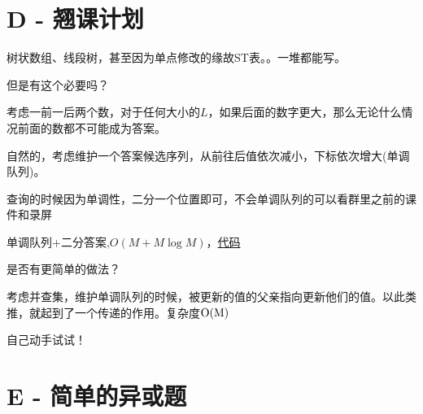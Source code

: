 \documentclass{beamer}
\begin{document}
  \section{D - 翘课计划}
  \begin{frame}
    树状数组、线段树，甚至因为单点修改的缘故ST表。。一堆都能写。

    \vspace*{1\baselineskip}

    但是有这个必要吗？

    \vspace*{1\baselineskip}
    
    考虑一前一后两个数，对于任何大小的$L$，如果后面的数字更大，那么无论什么情况前面的数都不可能成为答案。
    
    \vspace*{1\baselineskip}
    
    自然的，考虑维护一个答案候选序列，从前往后值依次减小，下标依次增大(单调队列)。
    
    \vspace*{1\baselineskip}

    查询的时候因为单调性，二分一个位置即可，不会单调队列的可以看群里之前的课件和录屏
  \end{frame}

  \begin{frame}
    单调队列+二分答案,$O(M+M\log{M})$，\href{https://syh521.cn/file/d-bound.cpp}{代码}

    \vspace*{1\baselineskip}

    是否有更简单的做法？

    \pause

    \vspace*{1\baselineskip}
    
    考虑并查集，维护单调队列的时候，被更新的值的父亲指向更新他们的值。以此类推，就起到了一个传递的作用。复杂度$\textmd{O(M)}$
    
    \vspace*{1\baselineskip}

    自己动手试试！
  \end{frame}

  \section{E - 简单的异或题}
\end{document}
